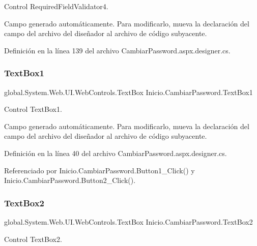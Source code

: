 Control Required\+Field\+Validator4. 

Campo generado automáticamente. Para modificarlo, mueva la declaración del campo del archivo del diseñador al archivo de código subyacente. 

Definición en la línea 139 del archivo Cambiar\+Password.\+aspx.\+designer.\+cs.

\mbox{\label{classInicio_1_1CambiarPassword_ab827a758058e29a7846579183e4cbcea}} 
\subsubsection{\texorpdfstring{TextBox1}{TextBox1}}
{\footnotesize\ttfamily global.\+System.\+Web.\+U\+I.\+Web\+Controls.\+Text\+Box Inicio.\+Cambiar\+Password.\+Text\+Box1\hspace{0.3cm}{\ttfamily [protected]}}



Control Text\+Box1. 

Campo generado automáticamente. Para modificarlo, mueva la declaración del campo del archivo del diseñador al archivo de código subyacente. 

Definición en la línea 40 del archivo Cambiar\+Password.\+aspx.\+designer.\+cs.



Referenciado por Inicio.\+Cambiar\+Password.\+Button1\+\_\+\+Click() y Inicio.\+Cambiar\+Password.\+Button2\+\_\+\+Click().

\mbox{\label{classInicio_1_1CambiarPassword_a7eeeb21567b9f20fcb890fbffc4146f4}} 
\subsubsection{\texorpdfstring{TextBox2}{TextBox2}}
{\footnotesize\ttfamily global.\+System.\+Web.\+U\+I.\+Web\+Controls.\+Text\+Box Inicio.\+Cambiar\+Password.\+Text\+Box2\hspace{0.3cm}{\ttfamily [protected]}}



Control Text\+Box2. 

